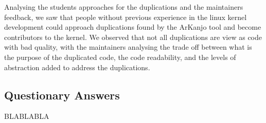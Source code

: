 Analysing the students approaches for the duplications and the maintainers feedback, 
we saw that people without previous experience in the linux kernel development could approach 
duplications found by the ArKanjo tool and become contributors to the kernel. We observed that 
not all duplications are view as code with bad quality, with the maintainers analysing the trade off
between what is the purpose of the duplicated code, the code readability, and the levels of abstraction 
added to address the duplications.

\subsection{Questionary Answers}

BLABLABLA
